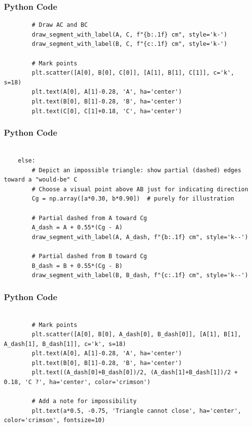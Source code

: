 \documentclass{beamer}
\begin{document}
\begin{frame}[fragile]
    \frametitle{Python Code}
    \begin{lstlisting}
        # Draw AC and BC
        draw_segment_with_label(A, C, f"{b:.1f} cm", style='k-')
        draw_segment_with_label(B, C, f"{c:.1f} cm", style='k-')

        # Mark points
        plt.scatter([A[0], B[0], C[0]], [A[1], B[1], C[1]], c='k', s=18)
        plt.text(A[0], A[1]-0.28, 'A', ha='center')
        plt.text(B[0], B[1]-0.28, 'B', ha='center')
        plt.text(C[0], C[1]+0.18, 'C', ha='center')
    \end{lstlisting}
\end{frame}

\begin{frame}[fragile]
    \frametitle{Python Code}
    \begin{lstlisting}
 
    else:
        # Depict an impossible triangle: show partial (dashed) edges toward a "would-be" C
        # Choose a visual point above AB just for indicating direction
        Cg = np.array([a*0.30, b*0.90])  # purely for illustration

        # Partial dashed from A toward Cg
        A_dash = A + 0.55*(Cg - A)
        draw_segment_with_label(A, A_dash, f"{b:.1f} cm", style='k--')

        # Partial dashed from B toward Cg
        B_dash = B + 0.55*(Cg - B)
        draw_segment_with_label(B, B_dash, f"{c:.1f} cm", style='k--')

    \end{lstlisting}
\end{frame}

\begin{frame}[fragile]
    \frametitle{Python Code}
    \begin{lstlisting}
 
        # Mark points
        plt.scatter([A[0], B[0], A_dash[0], B_dash[0]], [A[1], B[1], A_dash[1], B_dash[1]], c='k', s=18)
        plt.text(A[0], A[1]-0.28, 'A', ha='center')
        plt.text(B[0], B[1]-0.28, 'B', ha='center')
        plt.text((A_dash[0]+B_dash[0])/2, (A_dash[1]+B_dash[1])/2 + 0.18, 'C ?', ha='center', color='crimson')

        # Add a note for impossibility
        plt.text(a*0.5, -0.75, 'Triangle cannot close', ha='center', color='crimson', fontsize=10)
    \end{lstlisting}
\end{frame}
\end{document}
